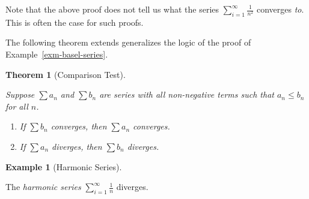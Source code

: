 \documentclass[
  letterpaper,
  DIV=11,
  numbers=noendperiod]{scrreprt}
\providecommand{\tightlist}{%
  \setlength{\itemsep}{0pt}\setlength{\parskip}{0pt}}
\theoremstyle{plain}
\newtheorem{theorem}{Theorem}[chapter]
\theoremstyle{definition}
\theoremstyle{plain}
\theoremstyle{plain}
\theoremstyle{definition}
\newtheorem{example}{Example}[chapter]
\theoremstyle{definition}
\theoremstyle{remark}
\begin{document}
Note that the above proof does not tell us what the series
\(\displaystyle\sum_{i=1}^\infty \frac{1}{n^2}\) converges \emph{to}.
This is often the case for such proofs.

The following theorem extends generalizes the logic of the proof of
Example~\ref{exm-basel-series}.

\begin{theorem}[Comparison
Test]\protect\hypertarget{thm-comparison-test}{}\label{thm-comparison-test}

Suppose \(\sum a_n\) and \(\sum b_n\) are series with all non-negative
terms such that \(a_n\leq b_n\) for all \(n\).

\begin{enumerate}
\def\labelenumi{\arabic{enumi}.}
\tightlist
\item
  If \(\sum b_n\) converges, then \(\sum a_n\) converges.
\item
  If \(\sum a_n\) diverges, then \(\sum b_n\) diverges.
\end{enumerate}

\end{theorem}

\begin{example}[Harmonic
Series]\protect\hypertarget{exm-harmonic-series}{}\label{exm-harmonic-series}

The \emph{harmonic series}
\(\displaystyle \sum_{i=1}^\infty \frac{1}{n}\) diverges.

\end{example}
\end{document}
